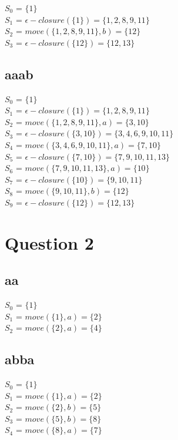 \documentclass[12pt, A4]{article}
\begin{document}
	$S_0$ = $\{1\}$\\
	$S_1$ = $\epsilon-closure(\{1\}) = \{1, 2 , 8, 9, 11\}$\\
	$S_2$ = $move(\{1, 2, 8, 9, 11\}, b) = \{12\}$\\
	$S_3$ = $\epsilon-closure(\{12\}) = \{12, 13\}$\\
	
	\subsection{aaab}
	
	$S_0$ = $\{1\}$\\
	$S_1$ = $\epsilon-closure(\{1\}) = \{1, 2 , 8, 9, 11\}$\\
	$S_2$ = $move(\{1, 2, 8, 9, 11\}, a) = \{3, 10\}$\\
	$S_3$ = $\epsilon-closure(\{3, 10\}) = \{3, 4, 6, 9, 10, 11\}$\\
	$S_4$ = $move(\{3, 4, 6, 9, 10, 11\}, a) = \{7, 10\}$\\
	$S_5$ = $\epsilon-closure(\{7, 10\}) = \{7, 9, 10, 11, 13\}$\\
	$S_6$ = $move(\{7, 9, 10, 11, 13\}, a) = \{10\}$\\
	$S_7$ = $\epsilon-closure(\{10\}) = \{9, 10, 11\}$\\
	$S_8$ = $move(\{9, 10, 11\}, b) = \{12\}$\\
	$S_9$ = $\epsilon-closure(\{12\}) = \{12, 13\}$\\
	
	\newpage
	
	\section{Question 2}
	
	\subsection{aa}
	
	$S_0$ = $\{1\}$\\
	$S_1$ = $move(\{1\}, a) = \{2\}$\\
	$S_2$ = $move(\{2\}, a) = \{4\}$\\
	
	\subsection{abba}
	
	$S_0$ = $\{1\}$\\
	$S_1$ = $move(\{1\}, a) = \{2\}$\\
	$S_2$ = $move(\{2\}, b) = \{5\}$\\
	$S_3$ = $move(\{5\}, b) = \{8\}$\\
	$S_4$ = $move(\{8\}, a) = \{7\}$\\
	
\end{document}
